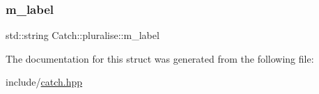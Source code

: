 \mbox{\label{struct_catch_1_1pluralise_a8849cbdd3f11ebe7747597c8644e8793}} 
\subsubsection{\texorpdfstring{m\+\_\+label}{m\_label}}
{\footnotesize\ttfamily std\+::string Catch\+::pluralise\+::m\+\_\+label}



The documentation for this struct was generated from the following file\+:\begin{DoxyCompactItemize}
\item 
include/\mbox{\hyperlink{catch_8hpp}{catch.\+hpp}}\end{DoxyCompactItemize}
